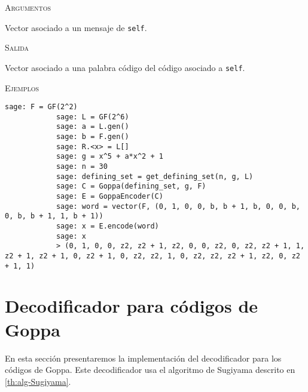 \begin{description}[leftmargin=1em, font=\normalfont\ttfamily, style=nextline]
\begin{description}[font=\ttfamily, style=nextline]
        \textsc{Argumentos}
        \begin{description}[font=\normalfont\ttfamily]
            \item[m] Vector asociado a un mensaje de \texttt{self}.
        \end{description}

        \textsc{Salida}
        \begin{description}[font=\normalfont\ttfamily]
            \item[] Vector asociado a una palabra código del código asociado a \texttt{self}.
        \end{description}

        \textsc{Ejemplos}
        \begin{lstlisting}[gobble=4]
            sage: F = GF(2^2)
            sage: L = GF(2^6)
            sage: a = L.gen()
            sage: b = F.gen()
            sage: R.<x> = L[]
            sage: g = x^5 + a*x^2 + 1
            sage: n = 30
            sage: defining_set = get_defining_set(n, g, L)
            sage: C = Goppa(defining_set, g, F)
            sage: E = GoppaEncoder(C)
            sage: word = vector(F, (0, 1, 0, 0, b, b + 1, b, 0, 0, b, 0, b, b + 1, 1, b + 1))
            sage: x = E.encode(word)
            sage: x
            > (0, 1, 0, 0, z2, z2 + 1, z2, 0, 0, z2, 0, z2, z2 + 1, 1, z2 + 1, z2 + 1, 0, z2 + 1, 0, z2, z2, 1, 0, z2, z2, z2 + 1, z2, 0, z2 + 1, 1)
        \end{lstlisting}
    \end{description}
\end{description}

\section{Decodificador para códigos de Goppa}

En esta sección presentaremos la implementación del decodificador para los códigos de Goppa. Este decodificador usa el algoritmo de Sugiyama descrito en \ref{th:alg-Sugiyama}.

